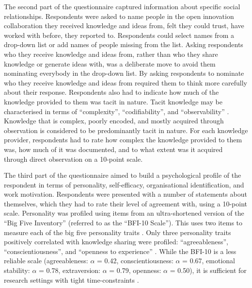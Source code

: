 The second part of the questionnaire captured information about specific social relationships. Respondents were asked to name people in the open innovation collaboration they received knowledge and ideas from, felt they could trust, have worked with before, they reported to. Respondents could select names from a drop-down list or add names of people missing from the list. Asking respondents who they receive knowledge and ideas from, rather than who they share knowledge or generate ideas with, was a deliberate move to avoid them nominating everybody in the drop-down list. By asking respondents to nominate who they receive knowledge and ideas from required them to think more carefully about their response. Respondents also had to indicate how much of the knowledge provided to them was tacit in nature. Tacit knowledge may be characterised in terms of \enquote{complexity}, \enquote{codifiability}, and \enquote{observability} \citep{winter987knowledge,zander1995knowledge,cavusgil2003tacit}. Knowledge that is complex, poorly encoded, and mostly acquired through observation is considered to be predominantly tacit in nature. For each knowledge provider, respondents had to rate how complex the knowledge provided to them was, how much of it was documented, and to what extent was it acquired through direct observation on a 10-point scale.\medskip 

The third part of the questionnaire aimed to build a psychological profile of the respondent in terms of personality, self-efficacy, organisational identification, and work motivation. Respondents were presented with a number of statements about themselves, which they had to rate their level of agreement with, using a 10-point scale. Personality was profiled using items from an ultra-shortened version of the \enquote{Big Five Inventory} (referred to as the \enquote{BFI-10 Scale}). This uses two items to measure each of the big five personality traits \citep{rammstedt2007measuring}. Only three personality traits positively correlated with knowledge sharing were profiled: \enquote{agreeableness}, \enquote{conscientiousness}, and \enquote{openness to experience} \citep{matzler2008personality,matzler2011personality}. While the BFI-10 is a less reliable scale (agreeableness: $\alpha$ = 0.42, conscientiousness: $\alpha$ = 0.67, emotional stability: $\alpha$ = 0.78, extraversion: $\alpha$ = 0.79, openness: $\alpha$ = 0.50), it is sufficient for research settings with tight time-constraints \citep{rammstedt2007measuring}.\medskip

